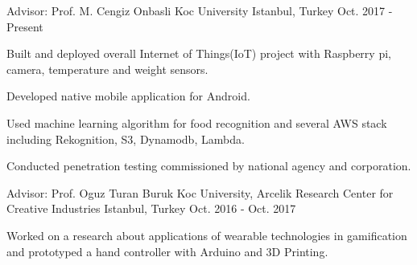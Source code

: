 \vspace{\acvSectionRemove}


\begin{cventries}
  \cventry
    {Advisor: Prof. M. Cengiz Onbasli} %
    {Koc University} %
    {Istanbul, Turkey} %
    {Oct. 2017 - Present} %
    {
      \begin{cvitems} %
        \item {Built and deployed overall Internet of Things(IoT) project with Raspberry pi, camera, temperature and weight sensors.  }
        \item {Developed native mobile application for Android. }
       	\item {Used machine learning algorithm for food recognition and several AWS stack including Rekognition, S3, Dynamodb, Lambda.} 
        \item {Conducted penetration testing commissioned by national agency and corporation.}
      \end{cvitems}
    }

  \cventry
    {Advisor: Prof. Oguz Turan Buruk} %
    {Koc University, Arcelik Research Center for Creative Industries} %
    {Istanbul, Turkey} %
    {Oct. 2016 - Oct. 2017} %
    {
      \begin{cvitems} %
         \item {Worked on a research about applications  of wearable technologies in gamification and prototyped a hand controller with Arduino and 3D Printing.}
      \end{cvitems}
    }

\end{cventries}
